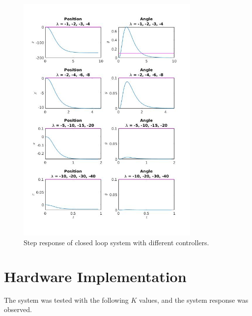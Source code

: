 \documentclass{journal}
\begin{document}
\begin{figure}
	\centering
	\includegraphics[width = 0.8\textwidth]{ES155Lab2_1c_steps.jpg}
	\caption{Step response of closed loop system with different controllers.}
	\label{ClosedLoopStep}
\end{figure}

\section*{Hardware Implementation}

The system was tested with the following $K$ values, and the system response was observed.
\end{document}

